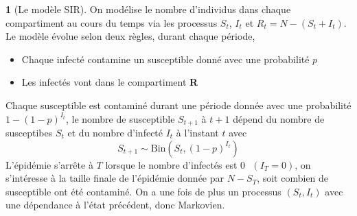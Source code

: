 \documentclass[8pt,notheorems]{beamer}
\theoremstyle{definition}
\theoremstyle{example}
\newtheorem{example}{\translate{Example}}
\theoremstyle{mystyle}
\theoremstyle{plain}
\begin{document}
\begin{frame}[allowframebreaks]
\begin{example}[Le modèle SIR]
On modélise le nombre d'individus dans chaque compartiment au cours du temps via les processus $S_t$, $I_t$ et $R_t=N-(S_t+I_t)$. Le modèle évolue selon deux règles, durant chaque période,
\begin{itemize}
\item Chaque infecté contamine un susceptible donné avec une probabilité $p$
\item Les infectés vont dans le compartiment \textbf{R}
\end{itemize}
Chaque susceptible est contaminé durant une période donnée avec une probabilité $1-(1-p)^{I_t}$, le nombre de susceptible $S_{t+1}$ à $t+1$ dépend du nombre de susceptibes $S_t$ et du nombre d'infecté $I_t$ à l'instant $t$ avec
$$
S_{t+1}\sim\text{Bin}(S_t, (1-p)^{I_t})
$$
L'épidémie s'arrête à $T$ lorsque le nombre d'infectés est $0\text{ }(I_T=0)$, on s'intéresse à la taille finale de l'épidémie donnée par $N-S_T$, soit combien de susceptible ont été contaminé. On a une fois de plus un processus $(S_t,I_t)$ avec une dépendance à l'état précédent, donc Markovien.
\end{example}
\end{frame}
\end{document}
